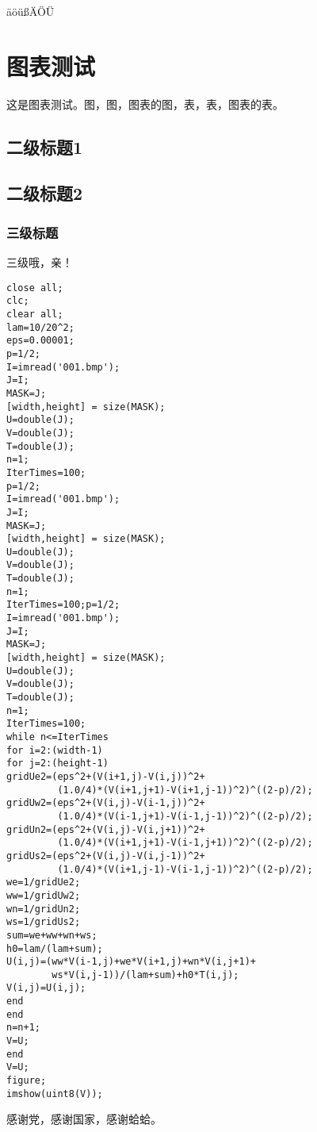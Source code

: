 \documentclass[%
               print, 
               timesmath
              ]{xjtubsc}
\begin{document}
äöüßÄÖÜ

\section{图表测试}
这是图表测试。图，图，图表的图，表，表，图表的表。
\subsection{二级标题1}
\subsection{二级标题2}
\subsubsection{三级标题}
三级哦，亲！



\backmatter





\begin{lstlisting}
close all;
clc;
clear all;
lam=10/20^2;
eps=0.00001;
p=1/2;
I=imread('001.bmp');
J=I;
MASK=J;
[width,height] = size(MASK);
U=double(J);
V=double(J);
T=double(J);
n=1;
IterTimes=100;
p=1/2;
I=imread('001.bmp');
J=I;
MASK=J;
[width,height] = size(MASK);
U=double(J);
V=double(J);
T=double(J);
n=1;
IterTimes=100;p=1/2;
I=imread('001.bmp');
J=I;
MASK=J;
[width,height] = size(MASK);
U=double(J);
V=double(J);
T=double(J);
n=1;
IterTimes=100;
while n<=IterTimes
for i=2:(width-1)
for j=2:(height-1)
gridUe2=(eps^2+(V(i+1,j)-V(i,j))^2+
         (1.0/4)*(V(i+1,j+1)-V(i+1,j-1))^2)^((2-p)/2);
gridUw2=(eps^2+(V(i,j)-V(i-1,j))^2+
         (1.0/4)*(V(i-1,j+1)-V(i-1,j-1))^2)^((2-p)/2);
gridUn2=(eps^2+(V(i,j)-V(i,j+1))^2+
         (1.0/4)*(V(i+1,j+1)-V(i-1,j+1))^2)^((2-p)/2);
gridUs2=(eps^2+(V(i,j)-V(i,j-1))^2+
         (1.0/4)*(V(i+1,j-1)-V(i-1,j-1))^2)^((2-p)/2);
we=1/gridUe2;
ww=1/gridUw2;
wn=1/gridUn2;
ws=1/gridUs2;
sum=we+ww+wn+ws;
h0=lam/(lam+sum);
U(i,j)=(ww*V(i-1,j)+we*V(i+1,j)+wn*V(i,j+1)+
		ws*V(i,j-1))/(lam+sum)+h0*T(i,j);
V(i,j)=U(i,j);
end
end
n=n+1;
V=U;
end
V=U;
figure;
imshow(uint8(V));
\end{lstlisting}

\blindmathpaper
\blindmathpaper
{}



\begin{acknowledgment}
感谢党，感谢国家，感谢蛤蛤。
\end{acknowledgment}
\end{document}

